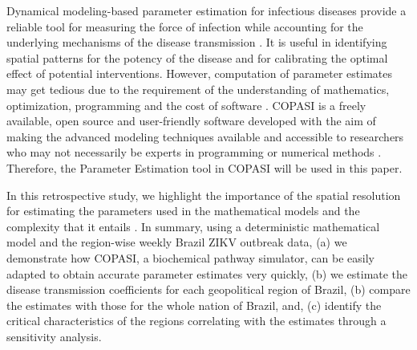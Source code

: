 \documentclass[10pt,letterpaper]{article}
\begin{document}
Dynamical modeling-based parameter estimation for infectious diseases provide a reliable tool for measuring the force of infection while accounting for the underlying mechanisms of the disease transmission \cite{overton2020using}. It is useful in identifying spatial patterns for the potency of the disease and for calibrating the optimal effect of potential interventions. However, computation of parameter estimates may get tedious due to the requirement of the understanding of mathematics, optimization, programming and the cost of software \cite{hernandez2018parameter}. COPASI \cite{hoops2006copasi} is a freely available, open source and user-friendly software developed with the aim of making the advanced modeling techniques available and accessible to researchers who may not necessarily be experts in programming or numerical methods \cite{bergmann2016piecewise}. Therefore, the Parameter Estimation tool in COPASI will be used in this paper. 

In this retrospective study, we highlight the importance of the spatial resolution for estimating the parameters used in the mathematical models and the complexity that it entails \cite{thomas2016quantifying}. In summary, using a deterministic mathematical model and the region-wise weekly Brazil ZIKV outbreak data, (a) we demonstrate how COPASI, a biochemical pathway simulator, can be easily adapted to obtain accurate parameter estimates very quickly, (b) we estimate the disease transmission coefficients for each geopolitical region of Brazil, (b) compare the estimates with those for the whole nation of Brazil, and, (c) identify the critical characteristics of the regions correlating with the estimates through a sensitivity analysis. 


    
\end{document}
